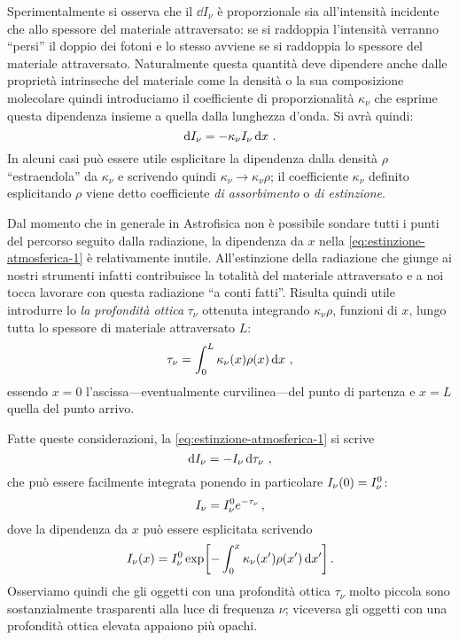         Sperimentalmente si osserva che il $\dd{I_\nu}$ è proporzionale sia all'intensità incidente che allo spessore del materiale attraversato: se si raddoppia l'intensità verranno ``persi'' il doppio dei fotoni e lo stesso avviene se si raddoppia lo spessore del materiale attraversato. Naturalmente questa quantità deve dipendere anche dalle proprietà intrinseche del materiale come la densità o la sua composizione molecolare quindi introduciamo il coefficiente di proporzionalità $\kappa_\nu$ che esprime questa dipendenza insieme a quella dalla lunghezza d'onda. Si avrà quindi:
        \begin{equation}
            \label{eq:estinzione-atmosferica-1}
            \dd{I_\nu} = - \kappa_\nu I_\nu \dd{x}
            \,.
        \end{equation}
        In alcuni casi può essere utile esplicitare la dipendenza dalla densità $\rho$ ``estraendola'' da $\kappa_\nu$ e scrivendo quindi $\kappa_\nu \to \kappa_\nu\rho$; il coefficiente $\kappa_\nu$ definito esplicitando $\rho$ viene detto coefficiente \emph{di assorbimento} o \emph{di estinzione}.

        Dal momento che in generale in Astrofisica non è possibile sondare tutti i punti del percorso seguito dalla radiazione, la dipendenza da $x$ nella \eqref{eq:estinzione-atmosferica-1} è relativamente inutile. All'estinzione della radiazione che giunge ai nostri strumenti infatti contribuisce la totalità del materiale attraversato e a noi tocca lavorare con questa radiazione ``a conti fatti''. Risulta quindi utile introdurre lo \emph{la profondità ottica} $\tau_\nu$ ottenuta integrando $\kappa_\nu\rho$, funzioni di $x$, lungo tutta lo spessore di materiale attraversato $L$:
        \begin{equation}
            \label{eq:spessore-ottico}
            \tau_\nu = \int_{0}^{L} \kappa_\nu\pqty{x} \rho\pqty{x} \dd{x}
            \mycomma
        \end{equation}
        essendo $x=0$ l'ascissa---eventualmente curvilinea---del punto di partenza e $x=L$ quella del punto arrivo.

        Fatte queste considerazioni, la \eqref{eq:estinzione-atmosferica-1} si scrive
        \begin{equation}
            \label{eq:estinzione-atmosferica-2}
            \dd{I_\nu} = -I_\nu \dd{\tau_\nu}
            \,,
        \end{equation}
        che può essere facilmente integrata ponendo in particolare $I_\nu\pqty{0} = I_{\nu}^{\text{0}}$:
        \begin{equation}
            I_\nu = I_{\nu}^{\text{0}} e^{-\tau_\nu}
            \,,
        \end{equation}
        dove la dipendenza da $x$ può essere esplicitata scrivendo
        \begin{equation*}
            I_{\nu}\pqty{x} = I_{\nu}^{\text{0}} \exp[-\int_{0}^{x} \kappa_\nu\pqty{x'} \rho\pqty{x'} \dd{x'}]
            \myperiod
        \end{equation*}
        Osserviamo quindi che gli oggetti con una profondità ottica $\tau_\nu$ molto piccola sono sostanzialmente trasparenti alla luce di frequenza $\nu$; viceversa gli oggetti con una profondità ottica elevata appaiono più opachi.
        